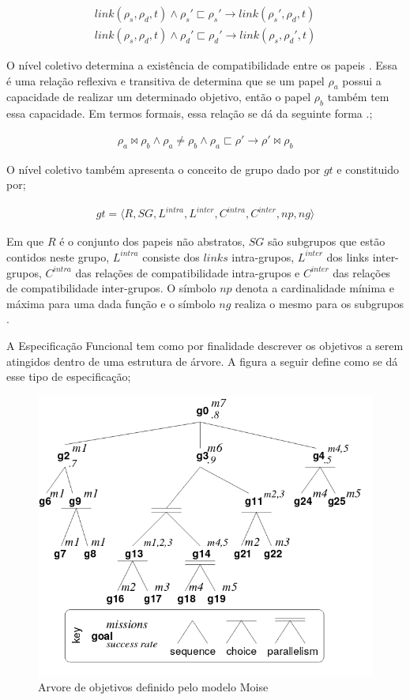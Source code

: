 \documentclass[12pt]{article}
\begin{document}
\begin{eqnarray}\nonumber
	link(\rho_s,\rho_d,t) \wedge \rho_s' \sqsubset \rho_s' \to link(\rho_s',\rho_d,t) \nonumber \\
	link(\rho_s,\rho_d,t) \wedge \rho_d' \sqsubset \rho_d' \to link(\rho_s,\rho_d',t) 	
\end{eqnarray}


O nível coletivo determina a existência de compatibilidade entre os papeis \cite{mosieframework}. Essa é uma relação reflexiva e transitiva de determina que se um papel $\rho_a$ possui a capacidade de realizar um determinado objetivo, então o papel $\rho_b$ também tem essa capacidade. Em termos formais, essa relação se dá da seguinte forma \cite{mosieframework}.;

\begin{eqnarray}\nonumber
	\rho_a \bowtie \rho_b \wedge \rho_a \neq \rho_b \wedge \rho_a \sqsubset \rho' \to \rho' \bowtie \rho_b 
\end{eqnarray}

O nível coletivo também apresenta o conceito de grupo dado por $gt$ e constituido por;

\begin{eqnarray}\nonumber
	gt = \langle R,SG,L^{intra},L^{inter},C^{intra},C^{inter},np,ng\rangle 
\end{eqnarray}

Em que $R$ é o conjunto dos papeis não abstratos, $SG$ são subgrupos que estão contidos neste grupo, $L^{intra}$ consiste dos $links$ intra-grupos, $L^{inter}$ dos links inter-grupos, $C^{intra}$ das relações de compatibilidade intra-grupos e $C^{inter}$ das relações de compatibilidade inter-grupos. O símbolo $np$ denota a cardinalidade mínima e máxima para uma dada função e o símbolo $ng$ realiza o mesmo para os subgrupos \cite{mosieframework}. 

A Especificação Funcional tem como por finalidade descrever os objetivos a serem atingidos dentro de uma estrutura de árvore. A figura a seguir define como se dá esse tipo de especificação; 

\begin{figure}[H]
  \centering
  \includegraphics[width=0.8\linewidth]{figmoise} 
  \caption{Arvore de objetivos definido pelo modelo Moise \cite{mosieframework}}
  \label{arvoremoise}
\end{figure}
\end{document}
